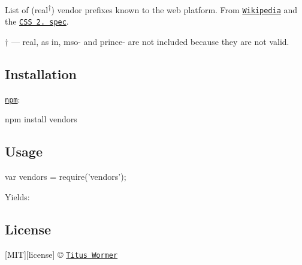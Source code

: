 List of (real\textsuperscript{†}) vendor prefixes known to the web platform. From \href{https://en.wikipedia.org/wiki/CSS_filter#Prefix_filters}{\tt Wikipedia} and the \href{https://www.w3.org/TR/CSS21/syndata.html#vendor-keyword-history}{\tt C\+SS 2. spec}.

† — real, as in, {\ttfamily mso-\/} and {\ttfamily prince-\/} are not included because they are not valid.

\subsection*{Installation}

\href{https://docs.npmjs.com/cli/install}{\tt npm}\+:


\begin{DoxyCode}
npm install vendors
\end{DoxyCode}


\subsection*{Usage}


\begin{DoxyCode}
var vendors = require('vendors');
\end{DoxyCode}


Yields\+:


\begin{DoxyCode}
\end{DoxyCode}


\subsection*{License}

\mbox{[}M\+IT\mbox{]}\mbox{[}license\mbox{]} © \href{http://wooorm.com}{\tt Titus Wormer} 